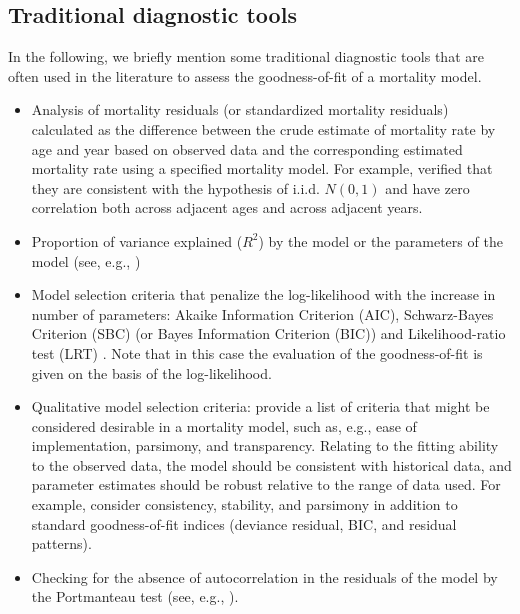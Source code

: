 \documentclass[fleqn,10pt]{wlscirep}
\begin{document}
\subsection*{Traditional diagnostic tools}
In the following, we briefly mention some traditional diagnostic tools that are often used in the literature to assess the goodness-of-fit of a mortality model. 
\begin{itemize}
\item Analysis of mortality residuals (or standardized mortality residuals) calculated as the difference between the crude estimate of mortality rate by age and year based on observed data and the corresponding estimated mortality rate using a specified mortality model. For example, \cite{Cairns2010} verified that they are consistent with the hypothesis of i.i.d. $N(0,1)$ and have zero correlation both across adjacent ages and across adjacent years.
\item Proportion of variance explained ($R^2$) by the model or the parameters of the model (see, e.g., \cite{Bongaarts2005})
\item Model selection criteria that penalize the log-likelihood with the increase in number of parameters: Akaike Information Criterion (AIC), Schwarz-Bayes Criterion (SBC) (or Bayes Information Criterion (BIC)) and Likelihood-ratio test (LRT) \cite{Li2009}. Note that in this case the evaluation of the goodness-of-fit is given on the basis of the log-likelihood. 
\item Qualitative model selection criteria: \cite{CBD08} provide a list of criteria that might be considered desirable in a mortality model, such as, e.g., ease of implementation, parsimony, and transparency. Relating to the fitting ability to the observed data, the model should be consistent with historical data, and parameter estimates should be robust relative to the range of data used. For example, \cite{Djeundje2022} consider consistency, stability, and parsimony in addition to standard goodness-of-fit indices (deviance residual, BIC, and residual patterns).
\item Checking for the absence of autocorrelation in the residuals of the model by the Portmanteau test (see, e.g., \cite{Torri2011}).
\end{itemize}
\color{black}
\end{document}
